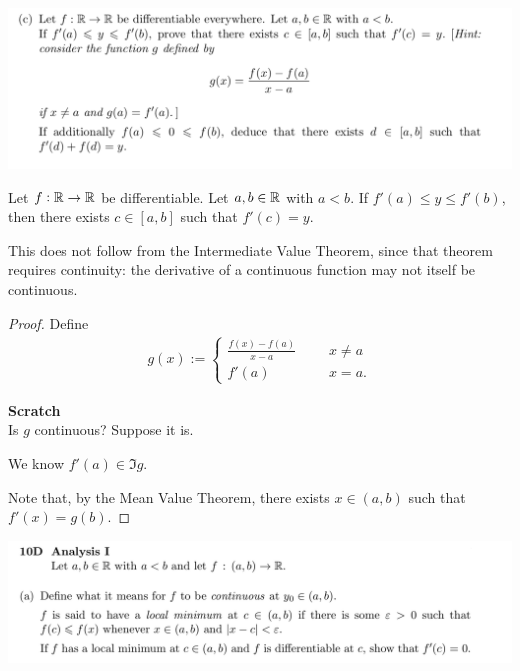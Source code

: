 \documentclass[12pt]{article}
\begin{document}
\begin{mdframed}
\includegraphics[width=400pt]{img/misc--cambridge-1a-2017-1-9D-3.png}
\end{mdframed}


\begin{theorem*}
  Let $f: \mathbb{R} \to \mathbb{R}$ be differentiable. Let $a, b \in \mathbb{R}$ with $a < b$. If
  $f'(a) \leq y \leq f'(b)$, then there exists $c \in [a, b]$ such that $f'(c) = y$.
\end{theorem*}

\begin{remark*}
  This does not follow from the Intermediate Value Theorem, since that theorem requires continuity:
  the derivative of a continuous function may not itself be continuous.
\end{remark*}

\begin{proof}
  Define
  \begin{align*}
    g(x) :=
    \begin{cases}
      \frac{f(x) - f(a)}{x - a} ~~~~~~~ &x \neq a\\
      f'(a) ~~~~~~~ &x = a.
    \end{cases}
  \end{align*}

  {\bf Scratch}\\
  Is $g$ continuous? Suppose it is.

  We know $f'(a) \in \Im g$.

  Note that, by the Mean Value Theorem, there exists $x \in (a, b)$ such that $f'(x) = g(b)$.


\end{proof}

\newpage
\begin{mdframed}
\includegraphics[width=400pt]{img/misc--cambridge-1a-10D-a.png}
\end{mdframed}
\end{document}
